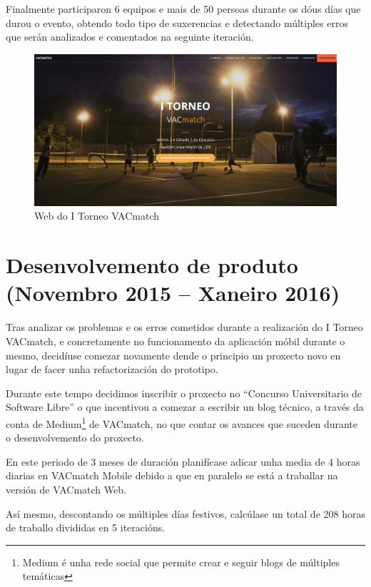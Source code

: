   Finalmente participaron 6 equipos e mais de 50 persoas durante os dóus días 
que durou o evento, obtendo todo tipo de suxerencias e detectando múltiples 
erros que serán analizados e comentados na seguinte iteración.

  \begin{figure}[h!]
        \begin{center}
        \includegraphics[width=\textwidth]{./img/torneo_vacmatch.png}
        \caption{Web do I Torneo VACmatch}
        \end{center}
  \end{figure}


  \section{Desenvolvemento de produto (Novembro 2015 -- Xaneiro 2016)}
  Tras analizar os problemas e os erros cometidos durante a realización do I 
Torneo VACmatch, e concretamente no funcionamento da aplicación móbil durante o 
mesmo, decidíuse comezar novamente dende o principio un proxecto novo en lugar 
de facer unha refactorización do prototipo.

    Durante este tempo decidimos inscribir o proxecto no ``Concurso 
Universitario de Software Libre'' o que incentivou a comezar a escribir un 
blog técnico, a través da conta de Medium\footnote{Medium é unha rede social 
que permite crear e seguir blogs de múltiples temáticas} de VACmatch, no que 
contar os avances que suceden durante o desenvolvemento do proxecto.

  En este periodo de 3 meses de duración planifícase adicar unha media de 4 
horas diarias en VACmatch Mobile debido a que en paralelo se está a traballar 
na versión de VACmatch Web.

  Así mesmo, descontando os múltiples días festivos, calcúlase un total de 208 
horas de traballo divididas en 5 iteracións.

